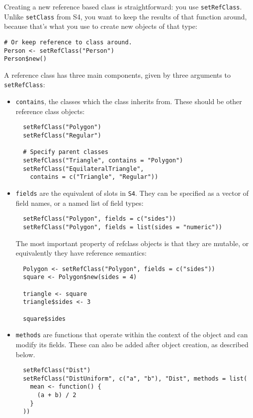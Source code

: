 Creating a new reference based class is straightforward: you use
\texttt{setRefClass}. Unlike \texttt{setClass} from S4, you want to keep
the results of that function around, because that's what you use to
create new objects of that type:

\begin{verbatim}
# Or keep reference to class around.
Person <- setRefClass("Person")
Person$new()
\end{verbatim}

A reference class has three main components, given by three arguments to
\texttt{setRefClass}:

\begin{itemize}
\item
  \texttt{contains}, the classes which the class inherits from. These
  should be other reference class objects:

\begin{verbatim}
  setRefClass("Polygon")
  setRefClass("Regular")

  # Specify parent classes
  setRefClass("Triangle", contains = "Polygon")
  setRefClass("EquilateralTriangle", 
    contains = c("Triangle", "Regular"))
\end{verbatim}
\item
  \texttt{fields} are the equivalent of slots in \texttt{S4}. They can
  be specified as a vector of field names, or a named list of field
  types:

\begin{verbatim}
  setRefClass("Polygon", fields = c("sides"))
  setRefClass("Polygon", fields = list(sides = "numeric"))
\end{verbatim}

  The most important property of refclass objects is that they are
  mutable, or equivalently they have reference semantics:

\begin{verbatim}
  Polygon <- setRefClass("Polygon", fields = c("sides"))
  square <- Polygon$new(sides = 4)

  triangle <- square
  triangle$sides <- 3

  square$sides        
\end{verbatim}
\item
  \texttt{methods} are functions that operate within the context of the
  object and can modify its fields. These can also be added after object
  creation, as described below.

\begin{verbatim}
  setRefClass("Dist")
  setRefClass("DistUniform", c("a", "b"), "Dist", methods = list(
    mean <- function() {
      (a + b) / 2
    }
  ))
\end{verbatim}
\end{itemize}

